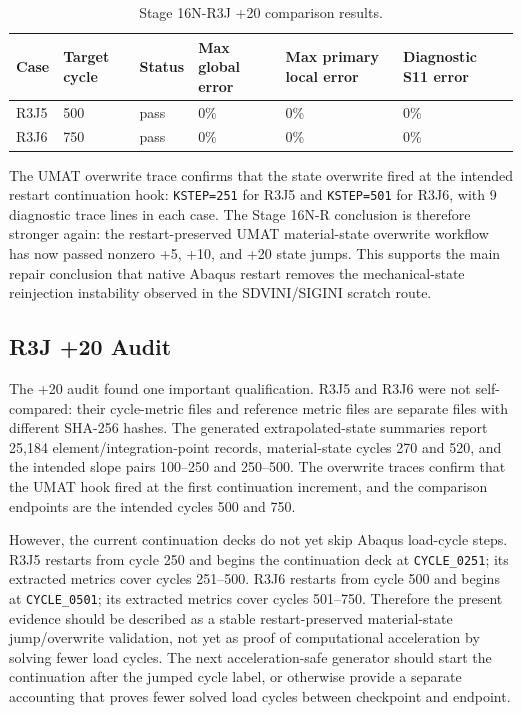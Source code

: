 \documentclass[11pt,a4paper]{article}
\newcommand{\code}[1]{\texttt{#1}}
\begin{document}
\begin{table}[H]
\centering
\caption{Stage 16N-R3J +20 comparison results.}
\begin{tabular}{llllll}
\toprule
Case & Target cycle & Status & Max global error & Max primary local error & Diagnostic S11 error \\
\midrule
R3J5 & 500 & pass & 0\% & 0\% & 0\% \\
R3J6 & 750 & pass & 0\% & 0\% & 0\% \\
\bottomrule
\end{tabular}
\end{table}

The UMAT overwrite trace confirms that the state overwrite fired at the intended restart continuation hook: \code{KSTEP=251} for R3J5 and \code{KSTEP=501} for R3J6, with 9 diagnostic trace lines in each case. The Stage 16N-R conclusion is therefore stronger again: the restart-preserved UMAT material-state overwrite workflow has now passed nonzero +5, +10, and +20 state jumps. This supports the main repair conclusion that native Abaqus restart removes the mechanical-state reinjection instability observed in the SDVINI/SIGINI scratch route.

\subsection{R3J +20 Audit}

The +20 audit found one important qualification. R3J5 and R3J6 were not self-compared: their cycle-metric files and reference metric files are separate files with different SHA-256 hashes. The generated extrapolated-state summaries report 25,184 element/integration-point records, material-state cycles 270 and 520, and the intended slope pairs 100--250 and 250--500. The overwrite traces confirm that the UMAT hook fired at the first continuation increment, and the comparison endpoints are the intended cycles 500 and 750.

However, the current continuation decks do not yet skip Abaqus load-cycle steps. R3J5 restarts from cycle 250 and begins the continuation deck at \code{CYCLE\_0251}; its extracted metrics cover cycles 251--500. R3J6 restarts from cycle 500 and begins at \code{CYCLE\_0501}; its extracted metrics cover cycles 501--750. Therefore the present evidence should be described as a stable restart-preserved material-state jump/overwrite validation, not yet as proof of computational acceleration by solving fewer load cycles. The next acceleration-safe generator should start the continuation after the jumped cycle label, or otherwise provide a separate accounting that proves fewer solved load cycles between checkpoint and endpoint.
\end{document}
